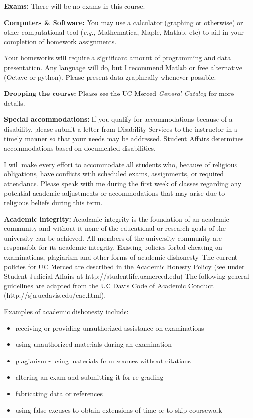 \documentclass{article}
\begin{document}
\textbf{Exams:} There will be no exams in this course.

\textbf{Computers \& Software:} You may use a calculator (graphing or
otherwise) or other computational tool (\textit{e.g.}, Mathematica, Maple,
Matlab, etc) to aid in your completion of homework assignments.  

Your homeworks will require a significant amount of programming and data
presentation.   Any language will do, but I recommend Matlab or free
alternative (Octave or python).    Please present data graphically whenever
possible.

\textbf{Dropping the course:}  Please see the UC Merced \textit{General
Catalog} for more details.

\textbf{Special accommodations:} If you qualify for accommodations
because of a disability, please submit a letter from Disability
Services to the instructor in a timely manner so that your needs may
be addressed.  Student Affairs determines accommodations based on
documented disabilities.

I will make every effort to accommodate all students who, because of
religious obligations, have conflicts with scheduled exams, assignments, or
required attendance.  Please speak with me during the first week of classes
regarding any potential academic adjustments or accommodations that may
arise due to religious beliefs during this term.

\clearpage
\textbf{Academic integrity:}  Academic integrity is the foundation of an
academic community and without it none of the educational or research goals
of the university can be achieved.  All members of the university community
are responsible for its academic integrity.  Existing policies forbid
cheating on examinations, plagiarism and other forms of academic dishonesty.
The current policies for UC Merced are described in the  Academic Honesty
Policy (see under Student Judicial Affairs at
http://studentlife.ucmerced.edu) The following general guidelines are
adapted from the UC Davis Code of Academic Conduct
(http://sja.ucdavis.edu/cac.html).

Examples of academic dishonesty include:
\begin{itemize}

\item receiving or providing unauthorized assistance on examinations

\item using unauthorized materials during an examination

\item plagiarism - using materials from sources without citations

\item altering an exam and submitting it for re-grading

\item fabricating data or references

\item using false excuses to obtain extensions of time or to skip
  coursework

\end{itemize}
\end{document}
